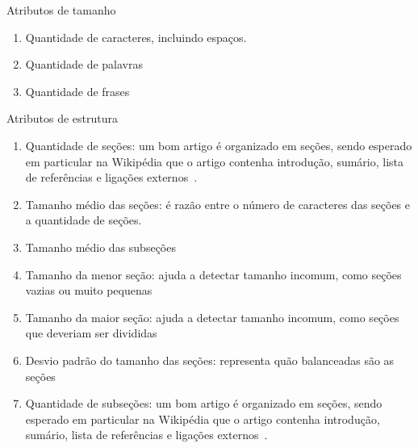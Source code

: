 Atributos de tamanho

\begin{enumerate}
    \item Quantidade de caracteres, incluindo espaços. %
	\item Quantidade de palavras %
	\item Quantidade de frases %
\end{enumerate}

Atributos de estrutura

\begin{enumerate}
    \item Quantidade de seções: um bom artigo é organizado em seções, sendo esperado em particular na Wikipédia que o artigo contenha introdução, sumário, lista de referências e ligações externos~\cite{Dalip:2009}.%
	\item Tamanho médio das seções: é razão entre o número de caracteres das seções e a quantidade de seções. %
	\item Tamanho médio das subseções %
	\item Tamanho da menor seção: ajuda a detectar tamanho incomum, como seções vazias ou muito pequenas %
	\item Tamanho da maior seção: ajuda a detectar tamanho incomum, como seções que deveriam ser divididas %
	\item Desvio padrão do tamanho das seções: representa quão balanceadas são as seções%
	\item Quantidade de subseções: um bom artigo é organizado em seções, sendo esperado em particular na Wikipédia que o artigo contenha introdução, sumário, lista de referências e ligações externos~\cite{Dalip:2009}.%

\end{enumerate}
